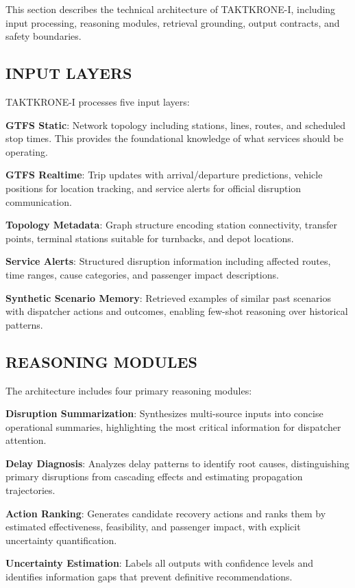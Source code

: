 \documentclass{IEEEoj}
\begin{document}
This section describes the technical architecture of TAKTKRONE-I, including input processing, reasoning modules, retrieval grounding, output contracts, and safety boundaries.

\subsection{INPUT LAYERS}

TAKTKRONE-I processes five input layers:

\textbf{GTFS Static}: Network topology including stations, lines, routes, and scheduled stop times. This provides the foundational knowledge of what services should be operating.

\textbf{GTFS Realtime}: Trip updates with arrival/departure predictions, vehicle positions for location tracking, and service alerts for official disruption communication.

\textbf{Topology Metadata}: Graph structure encoding station connectivity, transfer points, terminal stations suitable for turnbacks, and depot locations.

\textbf{Service Alerts}: Structured disruption information including affected routes, time ranges, cause categories, and passenger impact descriptions.

\textbf{Synthetic Scenario Memory}: Retrieved examples of similar past scenarios with dispatcher actions and outcomes, enabling few-shot reasoning over historical patterns.

\subsection{REASONING MODULES}

The architecture includes four primary reasoning modules:

\textbf{Disruption Summarization}: Synthesizes multi-source inputs into concise operational summaries, highlighting the most critical information for dispatcher attention.

\textbf{Delay Diagnosis}: Analyzes delay patterns to identify root causes, distinguishing primary disruptions from cascading effects and estimating propagation trajectories.

\textbf{Action Ranking}: Generates candidate recovery actions and ranks them by estimated effectiveness, feasibility, and passenger impact, with explicit uncertainty quantification.

\textbf{Uncertainty Estimation}: Labels all outputs with confidence levels and identifies information gaps that prevent definitive recommendations.
\end{document}
